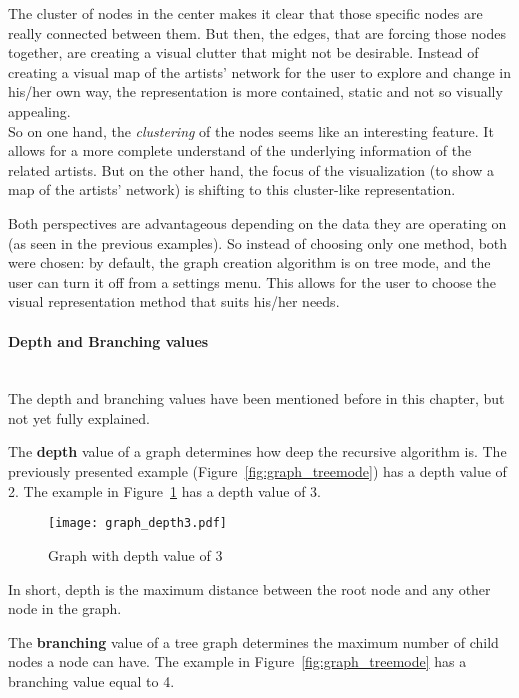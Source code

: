       The cluster of nodes in the center makes it clear that those specific nodes are really connected between them. 
      But then, the edges, that are forcing those nodes together, are creating a visual clutter that might not be desirable.
      Instead of creating a visual map of the artists' network for the user to  explore and change in his/her own way, the representation is more contained, static and not so visually appealing.
      \hfill \\

      So on one hand, the \emph{clustering} of the nodes seems like an interesting feature.
      It allows for a more complete understand of the underlying information of the related artists.
      But on the other hand, the focus of the visualization (to show a map of the artists' network) is shifting to this cluster-like representation.

      Both perspectives are advantageous depending on the data they are operating on (as seen in the previous examples).
      So instead of choosing only one method, both were chosen: by default, the graph creation algorithm is on tree mode, and the user can turn it off from a settings menu.
      This allows for the user to choose the visual representation method that suits his/her needs.

      \paragraph{Depth and Branching values} \hfill \\
      The depth and branching values have been mentioned before in this chapter, but not yet fully explained.

      The \textbf{depth} value of a graph determines how deep the recursive algorithm is.
      The previously presented example (Figure~\ref{fig:graph_treemode}) has a depth value of 2.
      The example in Figure~\ref{fig:graph_depth3} has a depth value of 3.
      \begin{figure}[hb]
        \begin{center}
          \texttt{[image: graph\_depth3.pdf]}
        \end{center}
        \caption{Graph with depth value of 3}
        \label{fig:graph_depth3}
      \end{figure}
      In short, depth is the maximum distance between the root node and any other node in the graph.

      The \textbf{branching} value of a tree graph determines the maximum number of child nodes a node can have.
      The example in Figure~\ref{fig:graph_treemode} has a branching value equal to 4.


